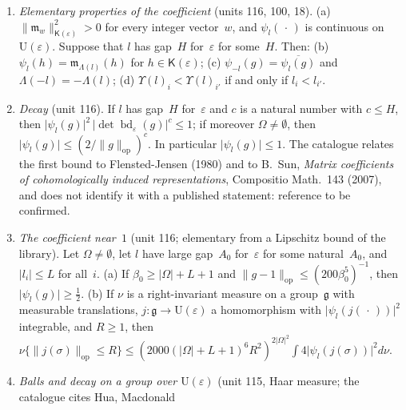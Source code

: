 \documentclass[11pt,a4paper]{article}
\newcommand{\m}[1]{\mbox{$#1$}}        %
\theoremstyle{plainx}
\theoremstyle{uprightx}
\newcommand{\abs}[1]{\lvert #1\rvert}
\newcommand{\hs}[1]{\lVert #1\rVert_{\mathrm{HS}}}
\newcommand{\op}[1]{\lVert #1\rVert_{\mathrm{op}}}
\newcommand{\Us}[1]{\mathrm{U}(#1)}                      %
\newcommand{\Ks}[1]{\mathsf{K}(#1)}                      %
\newcommand{\bd}[2]{\operatorname{bd}_{#1}(#2)}          %
\newcommand{\dg}[1]{\operatorname{diag}(#1)}             %
\newcommand{\lowk}[1]{\Lambda(#1)}                       %
\newcommand{\ups}[1]{\Upsilon(#1)}                       %
\newcommand{\dsc}[2]{\psi_{#1}(#2)}                      %
\newcommand{\fj}[3]{\operatorname{FJ}_{#1}(#2,#3)}       %
\newcommand{\wm}[2]{\mathfrak{m}_{#1}(#2)}               %
\newcommand{\ktn}[2]{\lVert\mathfrak{m}_{#2}\rVert^{2}_{\mathsf{K}(#1)}}   %
\begin{document}
\begin{enumerate}[label=\textup{(I\arabic*)},leftmargin=2.7em,itemsep=2.5pt]
  holds if \m{\hs{Y-1}<1}. (a) If $a$ is an \m{\Omega\times\Omega} matrix commuting with $\dg{\varepsilon}$ such that
  \m{a^{-1}g} is accretive, then \m{\dsc{l}{g}=\fj{l}{a}{a^{-1}g}}. (b) If $u'$ is a matrix with \m{u'_{ii'}=0} unless
  \m{l_i<l_{i'}} and \m{\varepsilon_i=\varepsilon_{i'}}, and $Y$ and \m{(1-u')Y} are accretive, then
  $\fj{l}{1}{((1-u')Y)^{*}}=\overline{\fj{l}{1}{Y}}$. Reference for (a): M.~Flensted-Jensen, \emph{Discrete series for
  semisimple symmetric spaces}, Ann.\ of Math.\ 111 (1980); place and relation to be confirmed. For (b): reference
  to be confirmed.
\item \emph{Elementary properties of the coefficient} (units 116, 100, 18). (a) \m{\ktn{\varepsilon}{w}>0} for every integer
  vector~$w$, and $\dsc{l}{\,\cdot\,}$ is continuous on $\Us{\varepsilon}$. Suppose that $l$ has gap~$H$ for~$\varepsilon$
  for some~$H$. Then: (b) \m{\dsc{l}{h}=\wm{\lowk{l}}{h}} for \m{h\in\Ks{\varepsilon}}; (c)
  $\dsc{-l}{g}=\overline{\dsc{l}{g}}$ and \m{\lowk{-l}=-\lowk{l}}; (d) \m{\ups{l}_i<\ups{l}_{i'}} if and only if
  \m{l_i<l_{i'}}.
\item \emph{Decay} (unit 116). If $l$ has gap~$H$ for~$\varepsilon$ and $c$ is a natural number with \m{c\le H}, then
  $\abs{\dsc{l}{g}}^{2}\,\abs{\det\bd{\varepsilon}{g}}^{c}\le1$; if moreover \m{\Omega\ne\emptyset}, then
  $\abs{\dsc{l}{g}}\le(2/\op{g})^{c}$. In particular \m{\abs{\dsc{l}{g}}\le1}. The catalogue relates the first bound
  to Flensted-Jensen (1980) and to B.~Sun, \emph{Matrix coefficients of cohomologically induced representations},
  Compositio Math.\ 143 (2007), and does not identify it with a published statement: reference to be confirmed.
\item \emph{The coefficient near~$1$} (unit 116; elementary from a Lipschitz bound of the library). Let
  \m{\Omega\ne\emptyset}, let $l$ have large gap~$A_0$ for~$\varepsilon$ for some natural~$A_0$, and \m{\abs{l_i}\le L}
  for all~$i$. (a) If \m{\beta_0\ge\abs{\Omega}+L+1} and $\op{g-1}\le(200\beta_0^{5})^{-1}$, then
  \m{\abs{\dsc{l}{g}}\ge\tfrac12}. (b) If $\nu$ is a right-invariant measure on a group~$\mathfrak{g}$ with measurable
  translations, \m{j\colon \mathfrak{g}\to\Us{\varepsilon}} a homomorphism with $\abs{\dsc{l}{j(\,\cdot\,)}}^{2}$ integrable, and
  \m{R\ge1}, then
  $\nu\{\op{j(\sigma)}\le R\}\le(2000(\abs{\Omega}+L+1)^{6}R^{2})^{2\abs{\Omega}^{2}}\int4\abs{\dsc{l}{j(\sigma)}}^{2}d\nu$.
\item \emph{Balls and decay on a group over $\Us{\varepsilon}$} (unit 115, Haar measure; the catalogue cites Hua, Macdonald

\end{enumerate}
\end{document}
